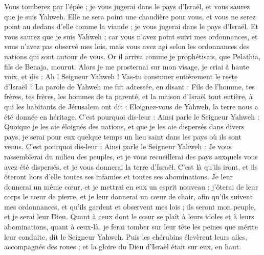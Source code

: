 \begin{multicols}{2}
Vous tomberez par l'épée ; je vous jugerai dans le pays d'Israël, et vous saurez que je suis Yahweh.
Elle ne sera point une chaudière pour vous, et vous ne serez point au dedans d'elle comme la viande ; je vous jugerai dans le pays d'Israël.
Et vous saurez que je suis Yahweh ; car vous n'avez point suivi mes ordonnances, et vous n'avez pas observé mes lois, mais vous avez agi selon les ordonnances des nations qui sont autour de vous.
Or il arriva comme je prophétisais, que Pelathia, fils de Benaja, mourut. Alors je me prosternai sur mon visage, je criai à haute voix, et dis : Ah ! Seigneur Yahweh ! Vas-tu consumer entièrement le reste d'Israël ?
La parole de Yahweh me fut adressée, en disant :
Fils de l'homme, tes frères, tes frères, les hommes de ta parenté, et la maison d'Israël tout entière, à qui les habitants de Jérusalem ont dit : Eloignez-vous de Yahweh, la terre nous a été donnée en héritage.
C'est pourquoi dis-leur : Ainsi parle le Seigneur Yahweh : Quoique je les aie éloignés des nations, et que je les aie dispersés dans divers pays, je serai pour eux quelque temps un lieu saint dans les pays où ils sont venus.
C'est pourquoi dis-leur : Ainsi parle le Seigneur Yahweh : Je vous rassemblerai du milieu des peuples, et je vous recueillerai des pays auxquels vous avez été dispersés, et je vous donnerai la terre d'Israël.
C'est là qu'ils iront, et ils ôteront hors d'elle toutes ses infamies et toutes ses abominations.
Je leur donnerai un même cœur, et je mettrai en eux un esprit nouveau ; j'ôterai de leur corps le cœur de pierre, et je leur donnerai un cœur de chair,
afin qu'ils suivent mes ordonnances, et qu'ils gardent et observent mes lois ; ils seront mon peuple, et je serai leur Dieu.
Quant à ceux dont le cœur se plaît à leurs idoles et à leurs abominations, quant à ceux-là, je ferai tomber sur leur tête les peines que mérite leur conduite, dit le Seigneur Yahweh.
Puis les chérubins élevèrent leurs ailes, accompagnés des roues ; et la gloire du Dieu d'Israël était sur eux, en haut.

\end{multicols}
